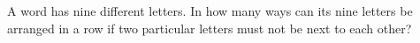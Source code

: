 A word has nine different letters. In how many ways can its nine letters be arranged in a row if two particular letters must not be next to each other?
